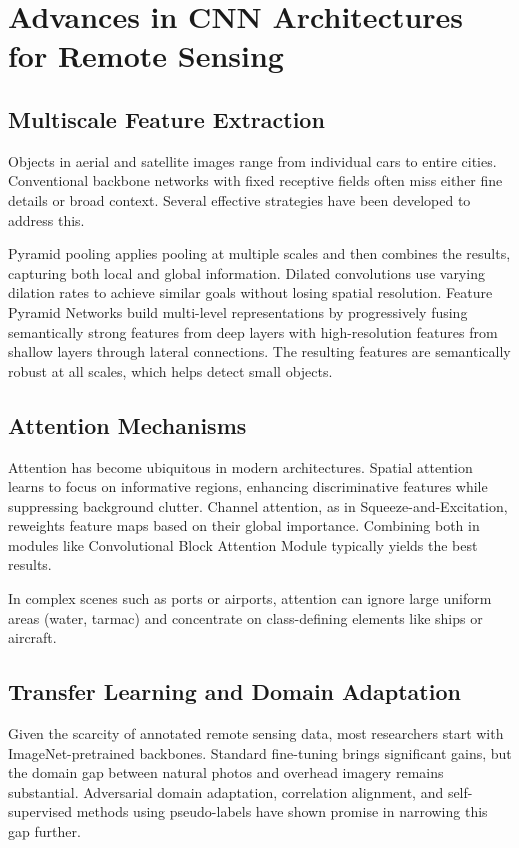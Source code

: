 \documentclass[12pt,a4paper]{article}
\begin{document}
\section{Advances in CNN Architectures for Remote Sensing}
\label{sec:developments}
\subsection{Multiscale Feature Extraction}
Objects in aerial and satellite images range from individual cars to entire cities. Conventional backbone networks with fixed receptive fields often miss either fine details or broad context. Several effective strategies have been developed to address this.

Pyramid pooling applies pooling at multiple scales and then combines the results, capturing both local and global information. Dilated convolutions use varying dilation rates to achieve similar goals without losing spatial resolution. Feature Pyramid Networks build multi-level representations by progressively fusing semantically strong features from deep layers with high-resolution features from shallow layers through lateral connections. The resulting features are semantically robust at all scales, which helps detect small objects.

\subsection{Attention Mechanisms}
Attention has become ubiquitous in modern architectures. Spatial attention learns to focus on informative regions, enhancing discriminative features while suppressing background clutter. Channel attention, as in Squeeze-and-Excitation, reweights feature maps based on their global importance. Combining both in modules like Convolutional Block Attention Module typically yields the best results.

In complex scenes such as ports or airports, attention can ignore large uniform areas (water, tarmac) and concentrate on class-defining elements like ships or aircraft.

\subsection{Transfer Learning and Domain Adaptation}
Given the scarcity of annotated remote sensing data, most researchers start with ImageNet-pretrained backbones. Standard fine-tuning brings significant gains, but the domain gap between natural photos and overhead imagery remains substantial. Adversarial domain adaptation, correlation alignment, and self-supervised methods using pseudo-labels have shown promise in narrowing this gap further.
\end{document}
